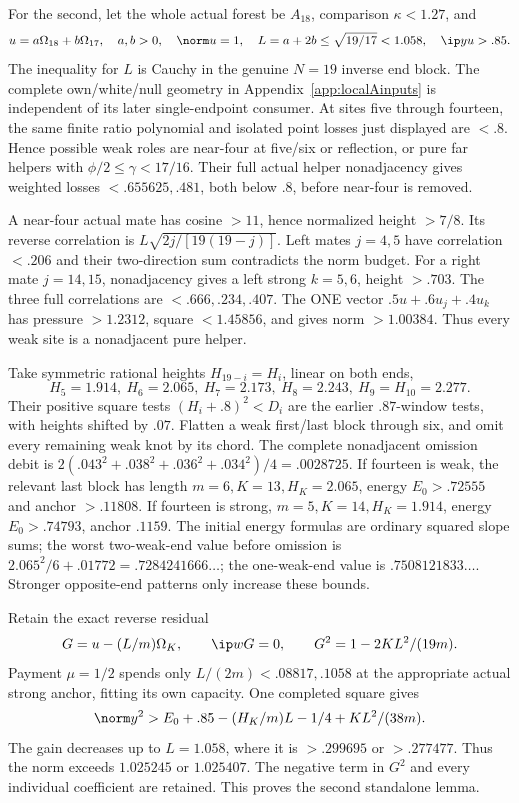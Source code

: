 For the second, let the whole actual forest be \(A_{18}\), comparison
\(\kappa<1.27\), and
\[
 u=a\Omega_{18}+b\Omega_{17},\quad a,b>0,\quad
 \norm u=1,\quad L=a+2b\leq\sqrt{19/17}<1.058,\quad
 \ip yu>.85 .
\]
The inequality for \(L\) is Cauchy in the genuine \(N=19\)
inverse end block.
The complete own/white/null geometry in
Appendix~\ref{app:localAinputs} is independent of its later
single-endpoint consumer.
At sites five through fourteen, the same finite ratio polynomial
and isolated point losses just displayed are \(<.8\).
Hence possible weak roles are near-four at five/six or reflection,
or pure far helpers with \(\phi/2\leq\gamma<17/16\).
Their full actual helper nonadjacency gives weighted losses
\(<.655625,.481\), both below \(.8\), before near-four is removed.

A near-four actual mate has cosine \(>11\), hence normalized
height \(>7/8\). Its reverse correlation is
\(L\sqrt{2j/[19(19-j)]}\).
Left mates \(j=4,5\) have correlation \(<.206\) and their
two-direction sum contradicts the norm budget.
For a right mate \(j=14,15\), nonadjacency gives a left strong
\(k=5,6\), height \(>.703\).
The three full correlations are \(<.666,.234,.407\).
The ONE vector \(.5u+.6u_j+.4u_k\) has pressure \(>1.2312\),
square \(<1.45856\), and gives norm \(>1.00384\).
Thus every weak site is a nonadjacent pure helper.

Take symmetric rational heights \(H_{19-i}=H_i\), linear on both ends,
\[
 H_5=1.914,\ H_6=2.065,\ H_7=2.173,\ H_8=2.243,\
 H_9=H_{10}=2.277 .
\]
Their positive square tests \((H_i+.8)^2<D_i\) are the
earlier \(.87\)-window tests, with heights shifted by \(.07\).
Flatten a weak first/last block through six, and omit every remaining
weak knot by its chord.
The complete nonadjacent omission debit is
\(2(.043^2+.038^2+.036^2+.034^2)/4=.0028725\).
If fourteen is weak, the relevant last block has length
\(m=6,K=13,H_K=2.065\), energy \(E_0>.72555\) and
anchor \(>.11808\).
If fourteen is strong, \(m=5,K=14,H_K=1.914\),
energy \(E_0>.74793\), anchor \(.1159\).
The initial energy formulas are ordinary squared slope sums;
the worst two-weak-end value before omission is
\(2.065^2/6+.01772=.7284241666\ldots\);
the one-weak-end value is \(.7508121833\ldots\).
Stronger opposite-end patterns only increase these bounds.

Retain the exact reverse residual
\[
 G=u-(L/m)\Omega_K,\qquad
 \ip wG=0,\qquad G^2=1-2KL^2/(19m).
\]
Payment \(\mu=1/2\) spends only \(L/(2m)<.08817,.1058\)
at the appropriate actual strong anchor, fitting its own capacity.
One completed square gives
\[
 \norm y^2>E_0+.85-(H_K/m)L-1/4+KL^2/(38m).
\]
The gain decreases up to \(L=1.058\), where it is
\(>.299695\) or \(>.277477\).
Thus the norm exceeds \(1.025245\) or \(1.025407\).
The negative term in \(G^2\) and every individual coefficient
are retained. This proves the second standalone lemma.

